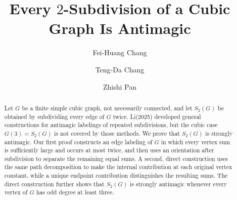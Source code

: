 \documentclass[preprint,12pt]{elsarticle}
\begin{document}
\begin{frontmatter}

\title{Every \(2\)-Subdivision of a Cubic Graph Is Antimagic}

\author[ndhu]{Fei-Huang Chang}

\author[ntu]{Teng-Da Chang}

\author[tku]{Zhishi Pan}


\address[ndhu]{Department of Applied Mathematics,
National Dong Hwa University, Hualien 974301, Taiwan}

\address[ntu]{Department of Mathematics,
National Taiwan University, Taipei 10617, Taiwan}

\address[tku]{Department of Mathematics,
Tamkang University, New Taipei City 251301, Taiwan}



\begin{abstract}
Let \(G\) be a finite simple cubic graph, not necessarily connected, and
let \(S_2(G)\) be obtained by subdividing every edge of \(G\) twice.
Li(2025) developed general constructions for antimagic labelings of repeated
subdivisions, but the cubic case \(G(3)=S_2(G)\) is not covered by those
methods. We prove that \(S_2(G)\) is strongly antimagic. Our first proof
constructs an edge labeling of \(G\) in which every vertex sum is
sufficiently large and occurs at most twice, and then uses an orientation
after subdivision to separate the remaining equal sums. A second, direct
construction uses the same path decomposition to make the internal
contribution at each original vertex constant, while a unique endpoint
contribution distinguishes the resulting sums. The direct construction
further shows that \(S_2(G)\) is strongly antimagic whenever every vertex
of \(G\) has odd degree at least three.
\end{abstract}



\end{frontmatter}
\end{document}
